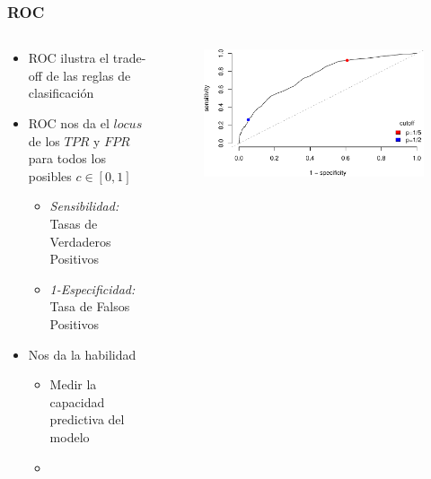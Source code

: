 \documentclass[
  shownotes,
  xcolor={svgnames},
  hyperref={colorlinks,citecolor=DarkBlue,linkcolor=DarkRed,urlcolor=DarkBlue}
  , aspectratio=169]{beamer}
\begin{document}
\begin{frame}[fragile]
\frametitle{ROC}


\begin{columns}[T] %
\begin{column}{.52\textwidth}
\begin{itemize}
\item ROC ilustra el trade-off de las reglas de clasificación
\medskip
\item ROC nos da el $locus $ de los $TPR$ y $FPR$ para todos los posibles $c\in[0,1]$
  \begin{itemize}
    \item {\it Sensibilidad:} Tasas de Verdaderos Positivos
    \item {\it 1-Especificidad:} Tasa de Falsos Positivos
    
  \end{itemize}
\item Nos da la habilidad
\begin{itemize}
  \item Medir la capacidad predictiva del modelo
  \medskip
  \item $\,$
  \medskip
\end{itemize}
\end{itemize}
\end{column}  
\hfill
\begin{column}{.48\textwidth}

 \begin{figure}[H] \centering
            \captionsetup{justification=centering}
              \includegraphics[scale=0.4]{figures/roc}                            
 \end{figure}

\end{column}
\end{columns}


\end{frame}
\end{document}
